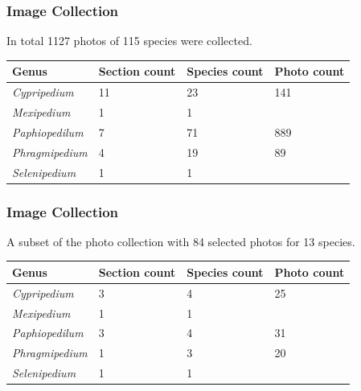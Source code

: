 \documentclass[]{beamer}
\begin{document}
    \begin{frame}[plain]
        \frametitle{Image Collection}

        In total 1127 photos of 115 species were collected.

        \begin{table}[h]\scriptsize
            \begin{center}
            \begin{tabular}{llll}
            \toprule
            \textbf{Genus} & \textbf{Section count} & \textbf{Species count} & \textbf{Photo count} \\
            \midrule
            \textit{Cypripedium} & 11 & 23 & 141 \\
            \textit{Mexipedium} & 1 & 1 & \color{red}{4} \\
            \textit{Paphiopedilum} & 7 & 71 & 889 \\
            \textit{Phragmipedium} & 4 & 19 & 89 \\
            \textit{Selenipedium} & 1 & 1 & \color{red}{4} \\
            \bottomrule
            \end{tabular}
            \end{center}
        \end{table}
    \end{frame}


    \begin{frame}[plain]
        \frametitle{Image Collection}

        A subset of the photo collection with 84 selected photos for 13 species.

        \begin{table}[h]\scriptsize
            \begin{center}
            \begin{tabular}{llll}
            \toprule
            \textbf{Genus} & \textbf{Section count} & \textbf{Species count} & \textbf{Photo count} \\
            \midrule
            \textit{Cypripedium} & 3 & 4 & 25 \\
            \textit{Mexipedium} & 1 & 1 & \color{red}{4} \\
            \textit{Paphiopedilum} & 3 & 4 & 31 \\
            \textit{Phragmipedium} & 1 & 3 & 20 \\
            \textit{Selenipedium} & 1 & 1 & \color{red}{4} \\
            \bottomrule
            \end{tabular}
            \end{center}
        \end{table}
    \end{frame}
\end{document}
